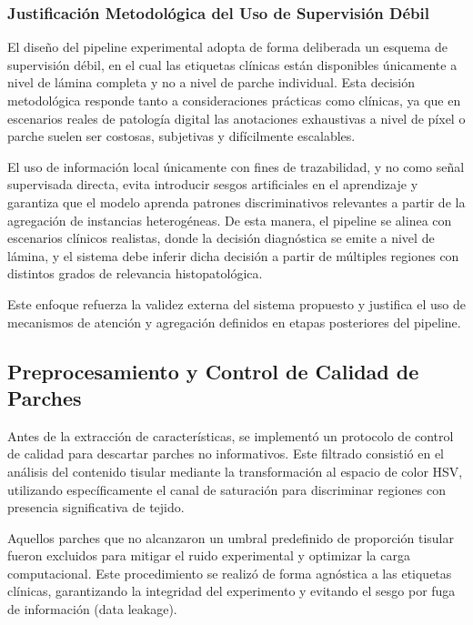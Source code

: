 \subsubsection{Justificación Metodológica del Uso de Supervisión Débil}
\label{subsec:weak_supervision}
El diseño del pipeline experimental adopta de forma deliberada un esquema de supervisión débil, en el cual las etiquetas clínicas están disponibles únicamente a nivel de lámina completa y no a nivel de parche individual. Esta decisión metodológica responde tanto a consideraciones prácticas como clínicas, ya que en escenarios reales de patología digital las anotaciones exhaustivas a nivel de píxel o parche suelen ser costosas, subjetivas y difícilmente escalables.\newline

El uso de información local únicamente con fines de trazabilidad, y no como señal supervisada directa, evita introducir sesgos artificiales en el aprendizaje y garantiza que el modelo aprenda patrones discriminativos relevantes a partir de la agregación de instancias heterogéneas. De esta manera, el pipeline se alinea con escenarios clínicos realistas, donde la decisión diagnóstica se emite a nivel de lámina, y el sistema debe inferir dicha decisión a partir de múltiples regiones con distintos grados de relevancia histopatológica.\newline

Este enfoque refuerza la validez externa del sistema propuesto y justifica el uso de mecanismos de atención y agregación definidos en etapas posteriores del pipeline.

\subsection{Preprocesamiento y Control de Calidad de Parches}
\label{subsec:preprocesamiento_patches}
Antes de la extracción de características, se implementó un protocolo de control de calidad para descartar parches no informativos. Este filtrado consistió en el análisis del contenido tisular mediante la transformación al espacio de color HSV, utilizando específicamente el canal de saturación para discriminar regiones con presencia significativa de tejido.\newline

Aquellos parches que no alcanzaron un umbral predefinido de proporción tisular fueron excluidos para mitigar el ruido experimental y optimizar la carga computacional. Este procedimiento se realizó de forma agnóstica a las etiquetas clínicas, garantizando la integridad del experimento y evitando el sesgo por fuga de información (data leakage).

